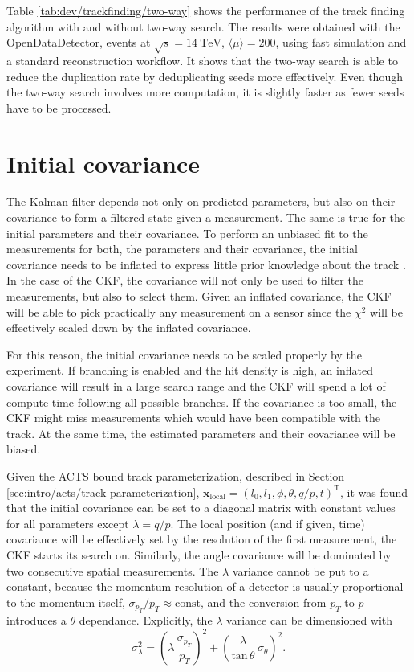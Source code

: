 

Table \ref{tab:dev/trackfinding/two-way} shows the performance of the track finding algorithm with and without two-way search. The results were obtained with the OpenDataDetector, \ttbar events at $\sqrt{s} = 14 \ \text{TeV}$, $\langle \mu \rangle = 200$, using fast simulation and a standard reconstruction workflow. It shows that the two-way search is able to reduce the duplication rate by deduplicating seeds more effectively. Even though the two-way search involves more computation, it is slightly faster as fewer seeds have to be processed.

\section{Initial covariance}

The Kalman filter depends not only on predicted parameters, but also on their covariance to form a filtered state given a measurement. The same is true for the initial parameters and their covariance. To perform an unbiased fit to the measurements for both, the parameters and their covariance, the initial covariance needs to be inflated to express little prior knowledge about the track \cite{fruehwirth}. In the case of the CKF, the covariance will not only be used to filter the measurements, but also to select them. Given an inflated covariance, the CKF will be able to pick practically any measurement on a sensor since the $\chi^2$ will be effectively scaled down by the inflated covariance.

For this reason, the initial covariance needs to be scaled properly by the experiment. If branching is enabled and the hit density is high, an inflated covariance will result in a large search range and the CKF will spend a lot of compute time following all possible branches. If the covariance is too small, the CKF might miss measurements which would have been compatible with the track. At the same time, the estimated parameters and their covariance will be biased.

Given the ACTS bound track parameterization, described in Section \ref{sec:intro/acts/track-parameterization}, $\mathbf{x}_\text{local} = \left(l_0, l_1, \phi, \theta, q/p, t\right)^\mathrm{T}$, it was found that the initial covariance can be set to a diagonal matrix with constant values for all parameters except $\lambda = q/p$. The local position (and if given, time) covariance will be effectively set by the resolution of the first measurement, the CKF starts its search on. Similarly, the angle covariance will be dominated by two consecutive spatial measurements. The $\lambda$ variance cannot be put to a constant, because the momentum resolution of a detector is usually proportional to the momentum itself, $\sigma_{p_T}/p_T \approx \text{const}$, and the conversion from $p_T$ to $p$ introduces a $\theta$ dependance. Explicitly, the $\lambda$ variance can be dimensioned with
\begin{equation}
    \sigma^2_\lambda = \left( \lambda \, \frac{\sigma_{p_T}}{p_T} \right)^2 + \left( \frac{\lambda}{\text{tan}\,\theta} \, \sigma_\theta \right)^2 \text{.}
\end{equation}

